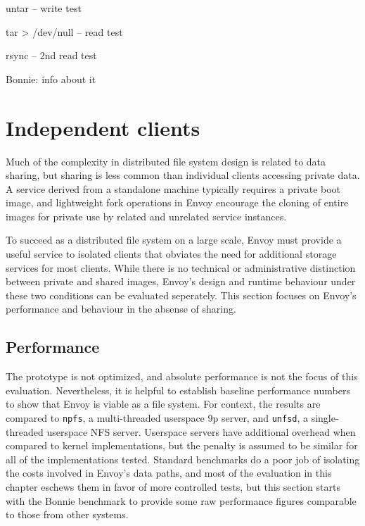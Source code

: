 untar -- write test

tar > /dev/null -- read test

rsync -- 2nd read test

Bonnie: info about it

\section{Independent clients}\label{sec:independent-clients}

Much of the complexity in distributed file system design is related to data sharing, but sharing is less common than individual clients accessing private data. A service derived from a standalone machine typically requires a private boot image, and lightweight fork operations in Envoy encourage the cloning of entire images for private use by related and unrelated service instances.

To succeed as a distributed file system on a large scale, Envoy must provide a useful service to isolated clients that obviates the need for additional storage services for most clients. While there is no technical or administrative distinction between private and shared images, Envoy's design and runtime behaviour under these two conditions can be evaluated seperately. This section focuses on Envoy's performance and behaviour in the absense of sharing.

\subsection{Performance}

The prototype is not optimized, and absolute performance is not the focus of this evaluation. Nevertheless, it is helpful to establish baseline performance numbers to show that Envoy is viable as a file system. For context, the results are compared to \texttt{npfs}, a multi-threaded userspace 9p server, and \texttt{unfsd}, a single-threaded userspace NFS server. Userspace servers have additional overhead when compared to kernel implementations, but the penalty is assumed to be similar for all of the implementations tested. Standard benchmarks do a poor job of isolating the costs involved in Envoy's data paths, and most of the evaluation in this chapter eschews them in favor of more controlled tests, but this section starts with the Bonnie benchmark to provide some raw performance figures comparable to those from other systems.

